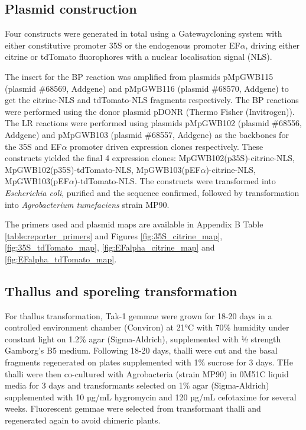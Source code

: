 \subsection{Plasmid construction}

Four constructs were generated in total  using a Gateway\textregistered cloning system with either constitutive promoter 35S or the endogenous promoter EF$\alpha$, driving either citrine or tdTomato fluorophores with a nuclear localisation signal (NLS).

The insert for the BP reaction was amplified from plasmids pMpGWB115 (plasmid \#68569, Addgene) and pMpGWB116 (plasmid \#68570, Addgene) \citep{RN72} to get the citrine-NLS and tdTomato-NLS fragments respectively. The BP reactions were performed using the donor plasmid pDONR (Thermo Fisher (Invitrogen)). The LR reactions were performed using plasmids pMpGWB102 (plasmid \#68556, Addgene) and pMpGWB103 (plasmid \#68557, Addgene)\citep{RN72} as the backbones for the 35S and EF$\alpha$ promoter driven expression clones respectively. These constructs yielded the final 4 expression clones: MpGWB102(p35S)-citrine-NLS, MpGWB102(p35S)-tdTomato-NLS, MpGWB103(pEF$\alpha$)-citrine-NLS, MpGWB103(pEF$\alpha$)-tdTomato-NLS. The constructs were transformed into \textit{Escherichia  coli}, purified and the sequence confirmed, followed by transformation into \textit{Agrobacterium tumefaciens} strain MP90.

The primers used and plasmid maps are available in Appendix B Table \ref{table:reporter_primers} and Figures \ref{fig:35S_citrine_map}, \ref{fig:35S_tdTomato_map}, \ref{fig:EFalpha_citrine_map} and \ref{fig:EFalpha_tdTomato_map}.

\subsection{Thallus and sporeling transformation}

For thallus transformation, Tak-1 gemmae were grown for 18-20 days in a controlled environment chamber (Conviron) at 21°C with 70\% humidity under constant light on 1.2\% agar (Sigma-Aldrich), supplemented with ½ strength Gamborg's B5 medium. Following 18-20 days, thalli were cut and the basal fragments regenerated on plates supplemented with 1\% sucrose for 3 days. THe thalli were then co-cultured with Agrobacteria (strain MP90) in 0M51C liquid media for 3 days and transformants selected on 1\% agar (Sigma-Aldrich) supplemented with 10 µg/mL hygromycin and 120 µg/mL cefotaxime for several weeks. Fluorescent gemmae were selected from transformant thalli and regenerated again to avoid chimeric plants\citep{RN147}. 

